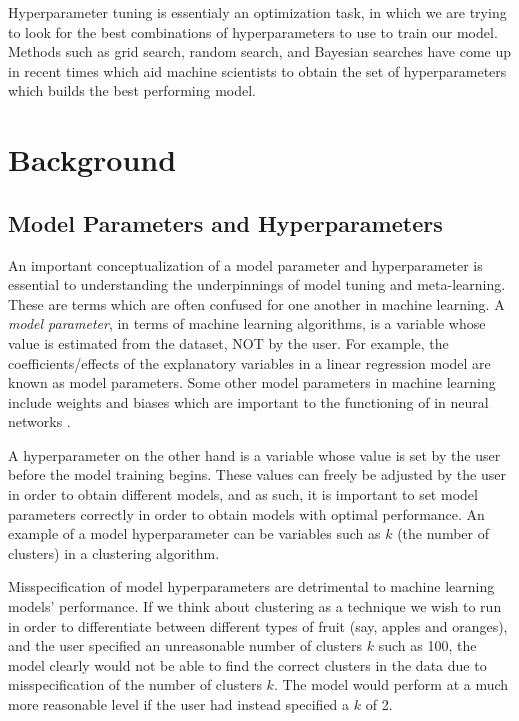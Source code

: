 \documentclass[12pt]{article}
\begin{document}
Hyperparameter tuning is essentialy an optimization task, in which we
are trying to look for the best combinations of hyperparameters to use
to train our model. Methods such as grid search, random search, and
Bayesian searches have come up in recent times which aid machine
scientists to obtain the set of hyperparameters which builds the best
performing model.

\newpage

\hypertarget{background}{%
\section{Background}\label{background}}

\label{sec:background}

\hypertarget{model-parameters-and-hyperparameters}{%
\subsection{Model Parameters and
Hyperparameters}\label{model-parameters-and-hyperparameters}}

\label{sec:param_hyperparam}

An important conceptualization of a model parameter and hyperparameter
is essential to understanding the underpinnings of model tuning and
meta-learning. These are terms which are often confused for one another
in machine learning. A \emph{model parameter}, in terms of machine
learning algorithms, is a variable whose value is estimated from the
dataset, NOT by the user. For example, the coefficients/effects of the
explanatory variables in a linear regression model are known as model
parameters. Some other model parameters in machine learning include
weights and biases which are important to the functioning of in neural
networks \citep{Yang2020}.

A hyperparameter on the other hand is a variable whose value is set by
the user before the model training begins. These values can freely be
adjusted by the user in order to obtain different models, and as such,
it is important to set model parameters correctly in order to obtain
models with optimal performance. An example of a model hyperparameter
can be variables such as \(k\) (the number of clusters) in a clustering
algorithm.

Misspecification of model hyperparameters are detrimental to machine
learning models' performance. If we think about clustering as a
technique we wish to run in order to differentiate between different
types of fruit (say, apples and oranges), and the user specified an
unreasonable number of clusters \(k\) such as 100, the model clearly
would not be able to find the correct clusters in the data due to
misspecification of the number of clusters \(k\). The model would
perform at a much more reasonable level if the user had instead
specified a \(k\) of 2.
\end{document}
